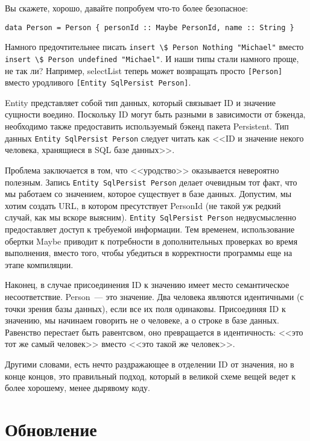 Вы скажете, хорошо, давайте попробуем что-то более безопасное:

\begin{lstlisting}
data Person = Person { personId :: Maybe PersonId, name :: String }
\end{lstlisting}

Намного предочтительнее писать \lstinline'insert \$ Person Nothing "Michael"' вместо \lstinline'insert \$ Person undefined "Michael"'. И наши типы стали намного проще, не так ли? Например, selectList теперь может возвращать просто \lstinline'[Person]' вместо уродливого \lstinline'[Entity SqlPersist Person]'.

\begin{remark}
Entity представляет собой тип данных, который связывает ID и значение сущности воедино. Поскольку ID могут быть разными в зависимости от бэкенда, необходимо также предоставить используемый бэкенд пакета Persistent. Тип данных \lstinline'Entity SqlPersist Person' следует читать как <<ID и значение некого человека, хранящиеся в SQL базе данных>>.
\end{remark}

Проблема заключается в том, что <<уродство>> оказывается невероятно полезным. Запись \lstinline'Entity SqlPersist Person' делает очевидным тот факт, что мы работаем со значением, которое существует в базе данных. Допустим, мы хотим создать URL, в котором пресутствует PersonId (не такой уж редкий случай, как мы вскоре выясним). \lstinline'Entity SqlPersist Person' недвусмысленно предоставляет доступ к требуемой информации. Тем временем, использование обертки Maybe приводит к потребности в дополнительных проверках во время выполнения, вместо того, чтобы убедиться в корректности программы еще на этапе компиляции.

Наконец, в случае присоединения ID к значению имеет место семантическое несоответствие. Person~--- это значение. Два человека являются идентичными (с точки зрения базы данных), если все их поля одинаковы. Присоединяя ID к значению, мы начинаем говорить не о человеке, а о строке в базе данных. Равенство перестает быть равентсвом, оно превращается в идентичность: <<это тот же самый человек>> вместо <<это такой же человек>>.

Другими словами, есть нечто раздражающее в отделении ID от значения, но в конце концов, это правильный подход, который в великой схеме вещей ведет к более хорошему, менее дырявому коду.

\section{Обновление} %

